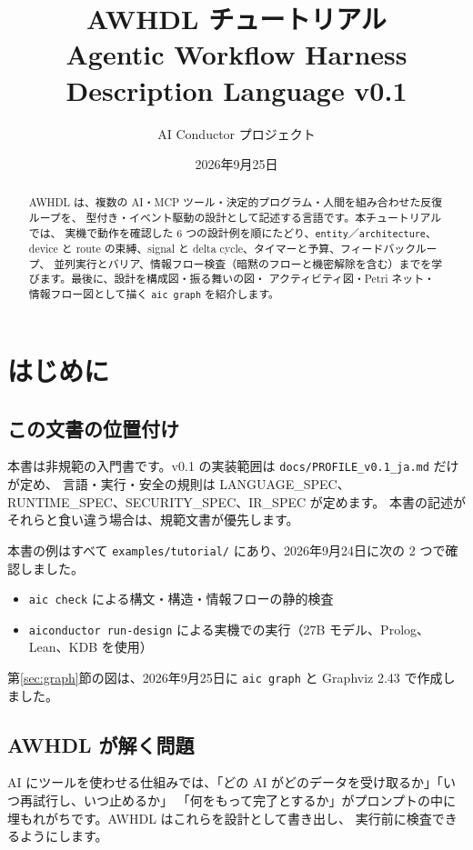 \documentclass[a4paper,11pt]{ltjsarticle}
\title{AWHDL チュートリアル\\\large Agentic Workflow Harness Description Language v0.1}
\author{AI Conductor プロジェクト}
\date{2026年9月25日}
\newcommand{\ex}[1]{\texttt{examples/tutorial/#1}}
\begin{document}
\maketitle

\begin{abstract}
AWHDL は、複数の AI・MCP ツール・決定的プログラム・人間を組み合わせた反復ループを、
型付き・イベント駆動の設計として記述する言語です。本チュートリアルでは、
実機で動作を確認した 6 つの設計例を順にたどり、\texttt{entity}／\texttt{architecture}、
device と route の束縛、signal と delta cycle、タイマーと予算、フィードバックループ、
並列実行とバリア、情報フロー検査（暗黙のフローと機密解除を含む）までを学びます。最後に、設計を構成図・振る舞いの図・
アクティビティ図・Petri ネット・情報フロー図として描く \texttt{aic graph} を紹介します。
\end{abstract}

\tableofcontents
\clearpage

\section{はじめに}

\subsection{この文書の位置付け}

本書は非規範の入門書です。v0.1 の実装範囲は \texttt{docs/PROFILE\_v0.1\_ja.md} だけが定め、
言語・実行・安全の規則は LANGUAGE\_SPEC、RUNTIME\_SPEC、SECURITY\_SPEC、IR\_SPEC が定めます。
本書の記述がそれらと食い違う場合は、規範文書が優先します。

本書の例はすべて \ex{} にあり、2026年9月24日に次の 2 つで確認しました。
\begin{itemize}
  \item \texttt{aic check} による構文・構造・情報フローの静的検査
  \item \texttt{aiconductor run-design} による実機での実行（27B モデル、Prolog、Lean、KDB を使用）
\end{itemize}
第\ref{sec:graph}節の図は、2026年9月25日に \texttt{aic graph} と Graphviz 2.43 で作成しました。

\subsection{AWHDL が解く問題}

AI にツールを使わせる仕組みでは、「どの AI がどのデータを受け取るか」「いつ再試行し、いつ止めるか」
「何をもって完了とするか」がプロンプトの中に埋もれがちです。AWHDL はこれらを設計として書き出し、
実行前に検査できるようにします。
\end{document}
